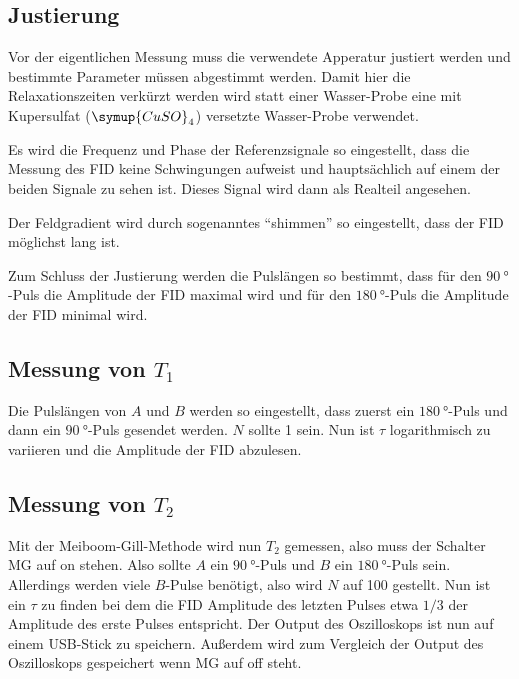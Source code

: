 \subsection{Justierung}
\label{ssec:Justierung}

Vor der eigentlichen Messung muss die verwendete Apperatur justiert werden und bestimmte Parameter müssen abgestimmt werden.
Damit hier die Relaxationszeiten verkürzt werden wird statt einer Wasser-Probe
eine mit Kupersulfat ($\symup{CuSO}_4$) versetzte Wasser-Probe verwendet.

Es wird die Frequenz und Phase der Referenzsignale so eingestellt, 
dass die Messung des FID keine Schwingungen aufweist und hauptsächlich auf einem der beiden Signale zu sehen ist.
Dieses Signal wird dann als Realteil angesehen.

Der Feldgradient wird durch sogenanntes \enquote{shimmen} so eingestellt, dass der FID möglichst lang ist.

Zum Schluss der Justierung werden die Pulslängen so bestimmt, 
dass für den $\SI{90}{\degree}$-Puls die Amplitude der FID maximal wird
und für den $\SI{180}{\degree}$-Puls die Amplitude der FID minimal wird.

\subsection{Messung von \texorpdfstring{$T_1$}{T1}}
\label{ssec:T1_messung}

Die Pulslängen von $A$ und $B$ werden so eingestellt, dass zuerst ein $\SI{180}{\degree}$-Puls und dann ein $\SI{90}{\degree}$-Puls gesendet werden.
$N$ sollte 1 sein.
Nun ist $\tau$ logarithmisch zu variieren und die Amplitude der FID abzulesen.

\subsection{Messung von \texorpdfstring{$T_2$}{T2}}
\label{ssec:T2_messung}

Mit der Meiboom-Gill-Methode wird nun $T_2$ gemessen, also muss der Schalter MG auf on stehen.
Also sollte $A$ ein $\SI{90}{\degree}$-Puls und $B$ ein $\SI{180}{\degree}$-Puls sein.
Allerdings werden viele $B$-Pulse benötigt, also wird $N$ auf 100 gestellt.
Nun ist ein $\tau$ zu finden bei dem die FID Amplitude des letzten Pulses etwa $1/3$ der Amplitude des erste Pulses entspricht.
Der Output des Oszilloskops ist nun auf einem USB-Stick zu speichern.
Außerdem wird zum Vergleich der Output des Oszilloskops gespeichert wenn MG auf off steht.


